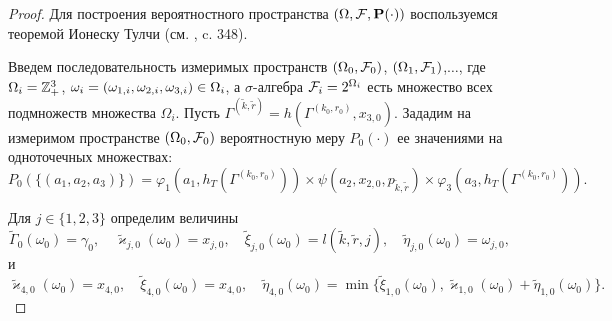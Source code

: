 \documentclass[a4paper,12pt,russian]{extarticle}
\begin{document}
\begin{proof}
Для построения вероятностного пространства $(\Omega, {\cal F}, \Pr(\cdot))$ воспользуемся теоремой Ионеску Тулчи (см. \cite{Shiryaev}, c. 348). 

Введем последовательность измеримых пространств $(\Omega_0, {\cal F}_0)$, $(\Omega_1, {\cal F}_1)$,$\ldots$, где $\Omega_i\hm=\mathbb{Z}_+^3$, $\omega_i=(\omega_{1,i},\omega_{2,i},\omega_{3,i}) \hm\in \Omega_i$, а $\sigma$-алгебра ${\cal F}_i=2^{\Omega_i}$  есть множество всех подмножеств множества $\Omega_i$. 
Пусть $\Gamma^{(\tilde{k},\tilde{r})}=h(\Gamma^{(k_0,r_0)},x_{3,0})$.
Зададим на измеримом пространстве $(\Omega_0, {\cal F}_0)$ вероятностную меру $P_0(\cdot)$ ее значениями на одноточечных множествах:
\begin{equation}
P_0(\{(a_1,a_2,a_3)\})=\varphi_1(a_1,h_T(\Gamma^{(k_0,r_0)})) \times \psi(a_2,x_{2,0}, p_{\tilde{k},\tilde{r}}) \times \varphi_3(a_3,h_T(\Gamma^{(k_0,r_0)})).
\label{probabilitiesOne}
\end{equation}

Для $j\in \{1,2,3\}$ определим величины
\begin{equation}
\tilde{\Gamma}_0(\omega_0)=\gamma_0, \quad \tilde{\varkappa}_{j,0}(\omega_0)=x_{j,0}, \quad \tilde{\xi}_{j,0}(\omega_0)=l(\tilde{k},\tilde{r},j), \quad \tilde{\eta}_{j,0}(\omega_0)=\omega_{j,0},
\label{startRekOne}
\end{equation}
и
\begin{equation}
 \tilde{\varkappa}_{4,0}(\omega_0)=x_{4,0}, \quad \tilde{\xi}_{4,0}(\omega_0)=x_{4,0}, \quad \tilde{\eta}_{4,0}(\omega_0)=\min\{\tilde{\xi}_{1,0}(\omega_0), \tilde{\varkappa}_{1,0}(\omega_0)+\tilde{\eta}_{1,0}(\omega_0)\}.
\label{startRekTwo}
\end{equation}


\end{proof}
\end{document}
